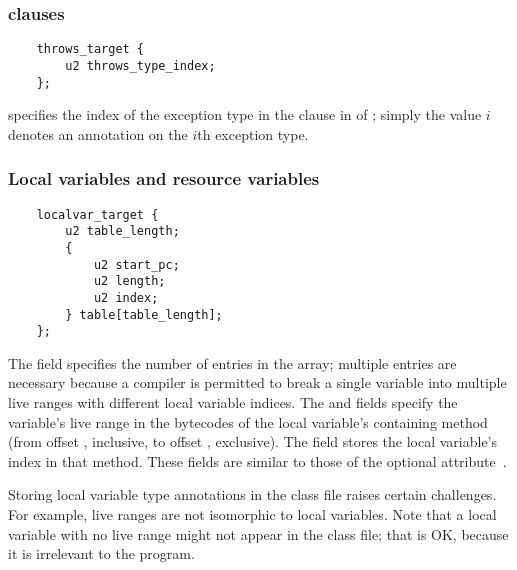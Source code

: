 \documentclass[10pt]{article}
\newcommand{\preverbnegspace}{\vspace{-5pt}}
\begin{document}
\subsubsection{ clauses\label{class-file:ext:ri:throws}}


\preverbnegspace
\begin{Verbatim}
    throws_target {
        u2 throws_type_index;
    };
\end{Verbatim}

 specifies the index of the exception type in the
clause in  of ;
simply the value $i$ denotes an annotation on the $i$th exception
type.



\subsubsection{Local variables and resource variables\label{class-file:ext:ri:localvar}}


\preverbnegspace
\begin{Verbatim}
    localvar_target {
        u2 table_length;
        {
            u2 start_pc;
            u2 length;
            u2 index;
        } table[table_length];
    };
\end{Verbatim}

The  field specifies the number of entries in the
 array; multiple entries are necessary because a compiler is
permitted to break a single variable into multiple live ranges with different
local variable indices.
The  and  fields specify the variable's
live range in the bytecodes of the local variable's containing method
(from offset , inclusive, to offset , exclusive).  The
 field stores the local variable's index in that method.
These fields are similar to those of the optional
 attribute~\cite[\S 4.8.12]{LindholmYBB2012}.

Storing local variable type annotations in the class file raises certain
challenges.  For example, live ranges are not isomorphic to local
variables.  Note that a local variable with no live range might not appear in
the class file; that is OK, because it is irrelevant to the program.
\end{document}
